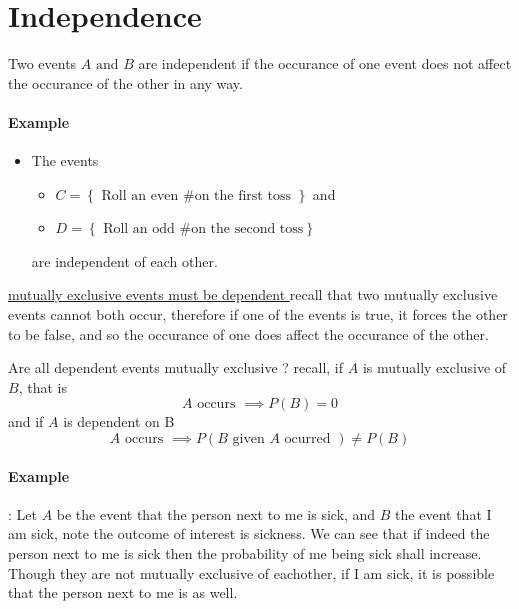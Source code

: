 \documentclass[11pt]{book}
\begin{document}
\section{Independence}%
\label{sec:independence}

\begin{defn}[Independent]\label{defn:independent}
    Two events $A \text{ and } B$ are independent if the occurance of one event does not affect the occurance of the other in any way.
\end{defn}

\paragraph{Example}
\begin{itemize}
    \item The events 
        \begin{itemize}
            \item $C = \left\{ \text{ Roll an even \# on the first toss }  \right\} $ and 
            \item $D= \left\{ \text{ Roll an odd \# on the second toss}  \right\} $ 
        \end{itemize}
        are independent of each other.
\end{itemize}

\underline{mutually exclusive events must be dependent } recall that two mutually exclusive events cannot both occur, therefore if one of the events is true, it forces the other to be false, and so the occurance of one does affect the occurance of the other.

\begin{eg}
    Are all dependent events mutually exclusive ?
    recall, if $A$ is mutually exclusive of $B$, that is 
    \[
    A \text{ occurs  }  \implies P\left(B\right) = 0
    \]
    and if $A$ is dependent on B  
    \[
    A \text{ occurs  } \implies P\left(B \text{ given  } A \text{ ocurred } \right) \neq P\left(B\right) 
    \]
    \paragraph{Example}: Let $A$ be the event that the person next to me is sick, and $B$ the event that I am sick, note the outcome of interest is sickness. We can see that if indeed the person next to me is sick then the probability of me being sick shall increase. Though they are not mutually exclusive of eachother, if I am sick, it is possible that the person next to me is as well. 
\end{eg}
\end{document}
